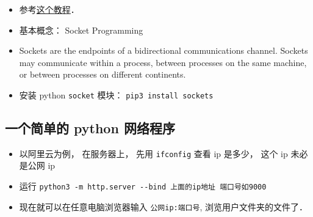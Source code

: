 
\begin{itemize}
\item 参考\href{https://www.tutorialspoint.com/python/python_networking.htm}{这个教程}．
\item 基本概念： Socket Programming
\item Sockets are the endpoints of a bidirectional communications channel. Sockets may communicate within a process, between processes on the same machine, or between processes on different continents.
\item 安装 python \verb|socket| 模块： \verb|pip3 install sockets|
\end{itemize}

\subsection{一个简单的 python 网络程序}
\begin{itemize}
\item 以阿里云为例， 在服务器上， 先用 \verb|ifconfig| 查看 ip 是多少， 这个 ip 未必是公网 ip
\item 运行 \verb|python3 -m http.server --bind 上面的ip地址 端口号如9000|
\item 现在就可以在任意电脑浏览器输入 \verb|公网ip:端口号|, 浏览用户文件夹的文件了．
\end{itemize}

